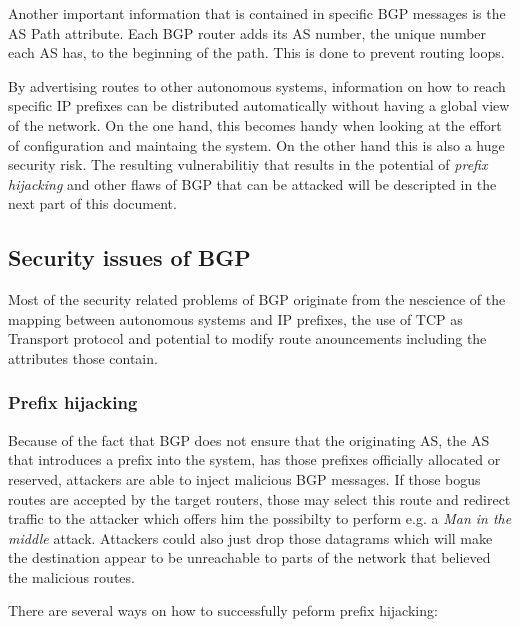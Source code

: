 \documentclass[12pt]{IEEEtran}
\begin{document}
	Another important information that is contained in specific BGP messages is the  AS Path attribute. Each BGP router adds its AS number, the unique number each AS has, to the beginning of the path. This is done to prevent routing loops. 

	By advertising routes to other autonomous systems, information on how to reach specific IP prefixes can be distributed automatically without having a global view of the network. On the one hand, this becomes handy when looking at the effort of configuration and maintaing the system. On the other hand this is also a huge security risk.
	The resulting vulnerabilitiy that results in the potential of \emph{prefix hijacking} and other flaws of BGP that can be attacked will be descripted in the next part of this document. 
	
	\subsection{Security issues of BGP}
		Most of the security related problems of BGP originate from the nescience of the mapping between autonomous systems and IP prefixes, the use of TCP as Transport protocol and potential to modify route anouncements including the attributes those contain.

		\subsubsection{Prefix hijacking}
		Because of the fact that BGP does not ensure that the originating AS, the AS that introduces a prefix into the system, has those prefixes officially allocated or reserved, attackers are able to inject malicious BGP messages. 
		If those bogus routes are accepted by the target routers, those may select this route and redirect traffic to the attacker which offers him the possibilty to perform e.g. a \emph{Man in the middle} attack. Attackers could also just drop those datagrams which will make the destination appear to be unreachable to parts of the network that believed the malicious routes. 

		There are several ways on how to successfully peform prefix hijacking:
\end{document}
